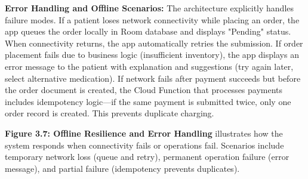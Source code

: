 \documentclass[12pt,a4paper]{report}
\begin{document}
\textbf{Error Handling and Offline Scenarios:} The architecture explicitly handles failure modes. If a patient loses network connectivity while placing an order, the app queues the order locally in Room database and displays "Pending" status. When connectivity returns, the app automatically retries the submission. If order placement fails due to business logic (insufficient inventory), the app displays an error message to the patient with explanation and suggestions (try again later, select alternative medication). If network fails after payment succeeds but before the order document is created, the Cloud Function that processes payments includes idempotency logic—if the same payment is submitted twice, only one order record is created. This prevents duplicate charging.

\textbf{Figure 3.7: Offline Resilience and Error Handling} illustrates how the system responds when connectivity fails or operations fail. Scenarios include temporary network loss (queue and retry), permanent operation failure (error message), and partial failure (idempotency prevents duplicates).
\end{document}
